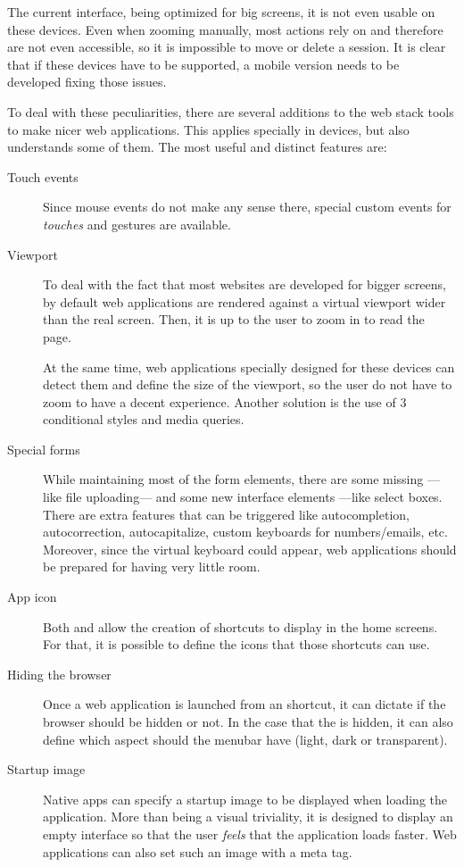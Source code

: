 The current  interface, being optimized for big screens, it is not even usable on these devices.
Even when zooming manually, most actions rely on  and therefore are not even accessible, so it is impossible to move or delete a session.
It is clear that if these devices have to be supported, a mobile version needs to be developed fixing those issues.

To deal with these peculiarities, there are several additions to the web stack tools to make nicer web applications.
This applies specially in  devices, but  also understands some of them.
The most useful and distinct features are:

\begin{description}
  \item[Touch events] Since mouse events do not make any sense there, special custom events for \emph{touches} and gestures are available.
  \item[Viewport] To deal with the fact that most websites are developed for bigger screens, by default web applications are rendered against a virtual viewport wider than the real screen.
  Then, it is up to the user to zoom in to read the page.
  
  At the same time, web applications specially designed for these devices can detect them and define the size of the viewport, so the user do not have to zoom to have a decent experience.
  Another solution is the use of 3 conditional styles and media queries.
  \item[Special forms] While maintaining most of the form elements, there are some missing ---like file uploading--- and some new interface elements ---like select boxes.
  There are extra features that can be triggered like autocompletion, autocorrection, autocapitalize, custom keyboards for numbers/emails, etc.
  Moreover, since the virtual keyboard could appear, web applications should be prepared for having very little room.
  \item[App icon] Both  and  allow the creation of shortcuts to display in the home screens.
  For that, it is possible to define the icons that those shortcuts can use.
  \item[Hiding the browser ] Once a web application is launched from an  shortcut, it can dictate if the browser  should be hidden or not.
  In the case that the  is hidden, it can also define which aspect should the menubar have (light, dark or transparent).
  \item[Startup image] Native  apps can specify a startup image to be displayed when loading the application.
  More than being a visual triviality, it is designed to display an empty interface so that the user \emph{feels} that the application loads faster.
  Web applications can also set such an image with a meta tag.
\end{description}

